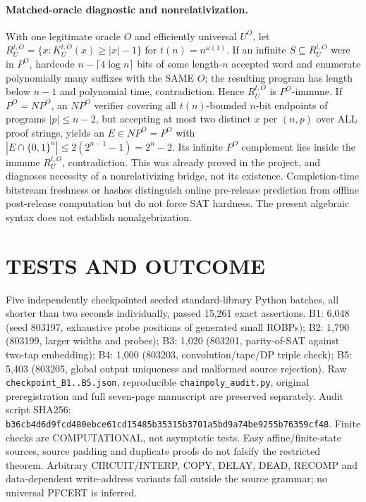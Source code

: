 \documentclass[11pt]{article}
\begin{document}
\paragraph{Matched-oracle diagnostic and nonrelativization.}
With one legitimate oracle $O$ and efficiently universal $U^O$, let $R_U^{t,O}=\{x:K_U^{t,O}(x)\ge|x|-1\}$ for $t(n)=n^{\omega(1)}$. If an infinite $S\subseteq R_U^{t,O}$ were in $P^O$, hardcode $n-\lceil4\log n\rceil$ bits of some length-$n$ accepted word and enumerate polynomially many suffixes with the SAME $O$; the resulting program has length below $n-1$ and polynomial time, contradiction. Hence $R_U^{t,O}$ is $P^O$-immune. If $P^O=NP^O$, an $NP^O$ verifier covering all $t(n)$-bounded $n$-bit endpoints of programs $|p|\le n-2$, but accepting at most two distinct $x$ per $(n,p)$ over ALL proof strings, yields an $E\in NP^O=P^O$ with $|E\cap\{0,1\}^n|\le 2(2^{n-1}-1)=2^n-2$. Its infinite $P^O$ complement lies inside the immune $R_U^{t,O}$, contradiction. This was already proved in the project, and diagnoses necessity of a nonrelativizing bridge, not its existence. Completion-time bitstream freshness or hashes distinguish online pre-release prediction from offline post-release computation but do not force SAT hardness. The present algebraic syntax does not establish nonalgebrization.
\section{TESTS AND OUTCOME}
Five independently checkpointed seeded standard-library Python batches, all shorter than two seconds individually, passed 15,261 exact assertions. B1: 6,048 (seed 803197, exhaustive probe positions of generated small ROBPs); B2: 1,790 (803199, larger widths and probes); B3: 1,020 (803201, parity-of-SAT against two-tap embedding); B4: 1,000 (803203, convolution/tape/DP triple check); B5: 5,403 (803205, global output uniqueness and malformed source rejection). Raw \texttt{checkpoint\_B1..B5.json}, reproducible \texttt{chainpoly\_audit.py}, original preregistration and full seven-page manuscript are preserved separately. Audit script SHA256: \texttt{b36cb4d6d9fcd480ebce61cd15485b35315b3701a5bd9a74be9255b76359cf48}. Finite checks are COMPUTATIONAL, not asymptotic tests. Easy affine/finite-state sources, source padding and duplicate proofs do not falsify the restricted theorem. Arbitrary CIRCUIT/INTERP, COPY, DELAY, DEAD, RECOMP and data-dependent write-address variants fall outside the source grammar; no universal PFCERT is inferred.
\end{document}
